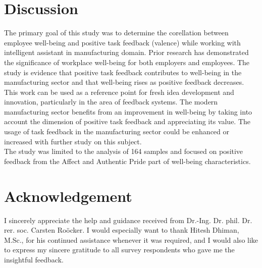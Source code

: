 \documentclass[conference]{IEEEtran}
\begin{document}
{\section{Discussion}
	The primary goal of this study was to determine the corellation between employee well-being and positive task feedback (valence) while working with intelligent assistant in manufacturing domain. Prior research has demonstrated the significance of workplace well-being for both employers and employees\cite{b7}. The study is evidence that positive task feedback contributes to well-being in the manufacturing sector and that well-being rises as positive feedback decreases.\\
	This work can be used as a reference point for fresh idea development and innovation, particularly in the area of feedback systems. The modern manufacturing sector benefits from an improvement in well-being by taking into account the dimension of positive task feedback and appreciating its value. The usage of task feedback in the manufacturing sector could be enhanced or increased with further study on this subject.\\
	The study was limited to the analysis of 164 samples and focused on positive feedback from the Affect and Authentic Pride part of well-being characteristics.
	
\section*{Acknowledgement}
	I sincerely appreciate the help and guidance received from Dr.-Ing. Dr. phil. Dr. rer. soc. Carsten Roöcker. I would especially want to thank Hitesh Dhiman, M.Sc., for his continued assistance whenever it was required, and I would also like to express my sincere gratitude to all survey respondents who gave me the insightful feedback.


\begin{thebibliography}{00}


\end{thebibliography}}
\end{document}
